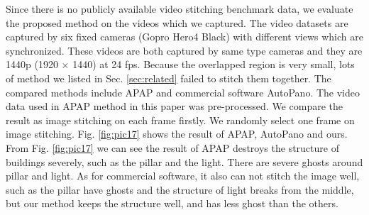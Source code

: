 \documentclass[conference]{IEEEtran}
\begin{document}
Since there is no publicly available video stitching benchmark data, we evaluate the proposed method on the 
videos which we captured.  The video datasets are captured by six fixed cameras (Gopro Hero4 Black) with different views which are synchronized. 
These videos are both captured by same type cameras and they are 1440p (1920 $\times$ 1440) at 24 fps.
Because the overlapped region is very small, lots of method we listed in Sec. \ref{sec:related} failed to stitch them together.
The compared methods include APAP and commercial software AutoPano. The video data used in APAP method in this paper was pre-processed. We compare the result as image stitching on each frame firstly.
We randomly select one frame on image stitching. Fig. \ref{fig:pic17} shows the result of APAP, AutoPano and ours. 
From Fig. \ref{fig:pic17} we can see the result of APAP 
destroys the structure of buildings severely, such as the pillar and the light. There are severe ghosts around pillar and light.
As for commercial software, it also can not stitch the image well, such as the pillar have ghosts and the structure of light breaks from the middle, 
but our method keeps the structure well, and has less ghost than the others.
\end{document}
